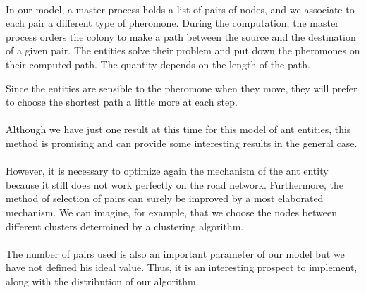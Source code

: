 \documentclass[a4paper, 10pt]{report}
\begin{document}
\paragraph{}In our model, a master process holds a list of pairs of nodes, and we associate to each pair a different type of pheromone. During the computation, the master process orders the colony to make a path between the source and the destination of a given pair. The entities solve their problem and put down the pheromones on their computed path. The quantity depends on the length of the path.

Since the entities are sensible to the pheromone when they move, they will prefer to choose the shortest path a little more at each step.

\paragraph{}Although we have just one result at this time for this model of ant entities, this method is promising and can provide some interesting results in the general case.

\paragraph{}However, it is necessary to optimize again the mechanism of the ant entity because it still does not work perfectly on the road network. Furthermore, the method of selection of pairs can surely be improved by a most elaborated mechanism. We can imagine, for example, that we choose the nodes between different clusters determined by a clustering algorithm.

\paragraph{}The number of pairs used is also an important parameter of our model but we have not defined his ideal value. Thus, it is an interesting prospect to implement, along with the distribution of our algorithm.

%
%
\end{document}
